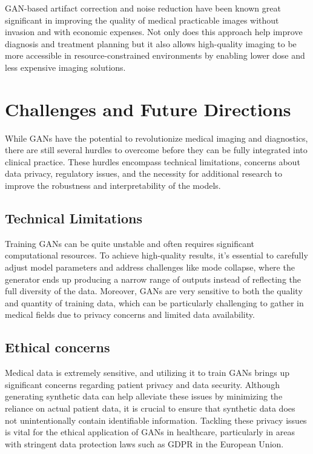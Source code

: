 \documentclass[12pt]{article}
\begin{document}
GAN-based artifact correction and noise reduction have been known great significant in improving the quality of medical practicable images without invasion and with economic expenses. Not only does this approach help improve diagnosis and treatment planning but it also allows high-quality imaging to be more accessible in resource-constrained environments by enabling lower dose and less expensive imaging solutions.

\section{Challenges and Future Directions}

While GANs have the potential to revolutionize medical imaging and diagnostics, there are still several hurdles to overcome before they can be fully integrated into clinical practice. These hurdles encompass technical limitations, concerns about data privacy, regulatory issues, and the necessity for additional research to improve the robustness and interpretability of the models.

\subsection{Technical Limitations}

Training GANs can be quite unstable and often requires significant computational resources. To achieve high-quality results, it's essential to carefully adjust model parameters and address challenges like mode collapse, where the generator ends up producing a narrow range of outputs instead of reflecting the full diversity of the data. Moreover, GANs are very sensitive to both the quality and quantity of training data, which can be particularly challenging to gather in medical fields due to privacy concerns and limited data availability.

\subsection{Ethical concerns}

Medical data is extremely sensitive, and utilizing it to train GANs brings up significant concerns regarding patient privacy and data security. Although generating synthetic data can help alleviate these issues by minimizing the reliance on actual patient data, it is crucial to ensure that synthetic data does not unintentionally contain identifiable information. Tackling these privacy issues is vital for the ethical application of GANs in healthcare, particularly in areas with stringent data protection laws such as GDPR in the European Union.
\end{document}
